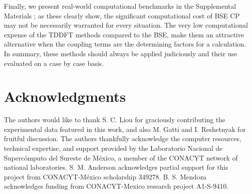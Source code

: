 \documentclass[aps,prb,10pt,showpacs,superscriptaddress,twocolumn,notitlepage]{revtex4-1}
\begin{document}
Finally, we present real-world computational benchmarks in the Supplemental
Materials \cite{supplement}; as these clearly show, the significant computational cost of BSE CP
may not be necessarily warranted for every situation. The very low computational
expense of the TDDFT methods compared to the BSE, make them an attractive
alternative when the coupling terms are the determining factors for a
calculation. In summary, these methods should always be applied judiciously and
their use evaluated on a case by case basis.


\section{Acknowledgments}

The authors would like to thank S. C. Liou for graciously contributing the
experimental data featured in this work, and also M. Gatti and I. Reshetnyak for
fruitful discussion. The authors thankfully acknowledge the computer resources,
technical expertise, and support provided by the Laboratorio Nacional de
Superc\'omputo del Sureste de M\'exico, a member of the CONACYT network of
national laboratories. S. M. Anderson acknowledges partial support for this
project from CONACYT-M\'exico scholarship 349278. B. S. Mendoza acknowledges
funding from CONACYT-Mexico research project A1-S-9410.




\end{document}
